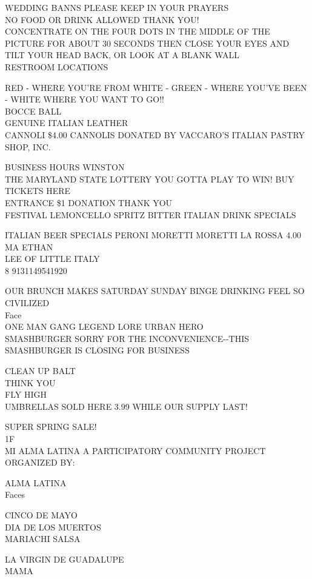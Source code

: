 \documentclass[10pt,letterpaper]{article}
\begin{document}
WEDDING BANNS PLEASE KEEP IN YOUR PRAYERS\\
NO FOOD OR DRINK ALLOWED THANK YOU!\\
CONCENTRATE ON THE FOUR DOTS IN THE MIDDLE OF THE PICTURE FOR ABOUT 30 SECONDS THEN CLOSE YOUR EYES AND TILT YOUR HEAD BACK, OR LOOK AT A BLANK WALL\\
RESTROOM LOCATIONS

RED {-} WHERE YOU'RE FROM WHITE {-} GREEN {-} WHERE YOU'VE BEEN {-} WHITE WHERE YOU WANT TO GO!!\\
BOCCE BALL\\
GENUINE ITALIAN LEATHER\\
CANNOLI \$4.00 CANNOLIS DONATED BY VACCARO'S ITALIAN PASTRY SHOP, INC.

BUSINESS HOURS WINSTON\\
THE MARYLAND STATE LOTTERY YOU GOTTA PLAY TO WIN!  BUY TICKETS HERE\\
ENTRANCE \$1 DONATION THANK YOU\\
FESTIVAL LEMONCELLO SPRITZ BITTER ITALIAN DRINK SPECIALS

ITALIAN BEER SPECIALS PERONI MORETTI MORETTI LA ROSSA 4.00\\
MA ETHAN\\
LEE OF LITTLE ITALY\\
8 9131149541920

OUR BRUNCH MAKES SATURDAY SUNDAY BINGE DRINKING FEEL SO CIVILIZED\\
Face\\
ONE MAN GANG LEGEND LORE URBAN HERO\\
SMASHBURGER SORRY FOR THE INCONVENIENCE{-}{-}THIS SMASHBURGER IS CLOSING FOR BUSINESS

CLEAN UP BALT\\
THINK YOU\\
FLY HIGH\\
UMBRELLAS SOLD HERE 3.99 WHILE OUR SUPPLY LAST!

SUPER SPRING SALE!\\
1F\\
MI ALMA LATINA A PARTICIPATORY COMMUNITY PROJECT ORGANIZED BY:

ALMA LATINA\\
Faces

CINCO DE MAYO\\
DIA DE LOS MUERTOS\\
MARIACHI SALSA

LA VIRGIN DE GUADALUPE\\
MAMA
\end{document}
